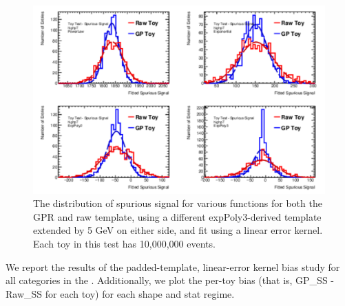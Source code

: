 \begin{figure} 
\begin{center}
  \includegraphics[width=\textwidth]{figures/background/gpr/validation/linear/ToyTest_FitSigVals_highpT_10M_noSig}   
\caption{The distribution of spurious signal for various functions for both the GPR and raw template, using a different expPoly3-derived template extended by 5 GeV on either side, and fit using a linear error kernel. Each toy in this test has 10,000,000 events.}
\label{fig:linearkernel_highpt_10M_noSig}
\end{center}
\end{figure}


We report the results of the padded-template, linear-error kernel bias study for all categories in the \Tab{\ref{tab:NoSigSSlinear}}. Additionally, we plot the per-toy bias (that is, GP\_SS - Raw\_SS for each toy) for each shape and stat regime.

